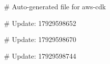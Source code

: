 # Auto-generated file for aws-cdk

# Update: 17929598652

# Update: 17929598670

# Update: 17929598744
